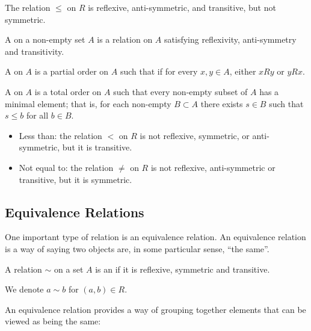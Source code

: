 \begin{example}
The relation $\le$ on $R$ is reflexive, anti-symmetric, and transitive, but not symmetric. 
\end{example}

\begin{definition}
A  on a non-empty set $A$ is a relation on $A$ satisfying reflexivity, anti-symmetry and transitivity.

A  on $A$ is a partial order on $A$ such that if for every $x,y\in A$, either $xRy$ or $yRx$.

A  on $A$ is a total order on $A$ such that every non-empty subset of $A$ has a minimal element; that is, for each non-empty $B\subset A$ there exists $s\in B$ such that $s\le b$ for all $b\in B$.
\end{definition}

\begin{example}
\begin{itemize}
\item Less than: the relation $<$ on $R$ is not reflexive, symmetric, or anti-symmetric, but it is transitive.
\item Not equal to: the relation $\neq$ on $R$ is not reflexive, anti-symmetric or transitive, but it is symmetric.
\end{itemize}
\end{example}

\subsection{Equivalence Relations}
One important type of relation is an equivalence relation. An equivalence relation is a way of saying two objects are, in some particular sense, ``the same''.

\begin{definition}
A relation $\sim$ on a set $A$ is an  if it is reflexive, symmetric and transitive.
\end{definition}

\begin{notation}
We denote $a\sim b$ for $(a,b)\in R$.
\end{notation}

An equivalence relation provides a way of grouping together elements that can be viewed as being the same:

